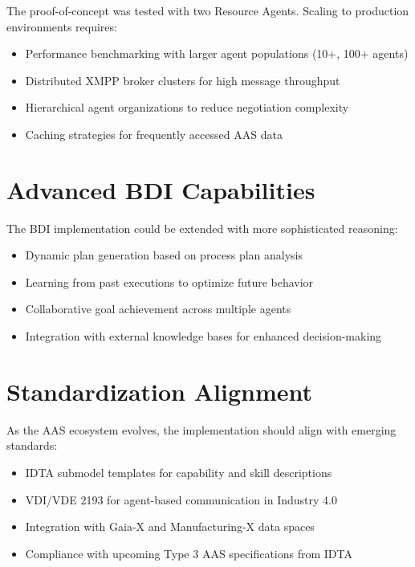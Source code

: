 The proof-of-concept was tested with two Resource Agents. Scaling to production environments requires:

\begin{itemize}
    \item Performance benchmarking with larger agent populations (10+, 100+ agents)
    \item Distributed \ac{XMPP} broker clusters for high message throughput
    \item Hierarchical agent organizations to reduce negotiation complexity
    \item Caching strategies for frequently accessed \ac{AAS} data
\end{itemize}

\section{Advanced BDI Capabilities}

The BDI implementation could be extended with more sophisticated reasoning:

\begin{itemize}
    \item Dynamic plan generation based on process plan analysis
    \item Learning from past executions to optimize future behavior
    \item Collaborative goal achievement across multiple agents
    \item Integration with external knowledge bases for enhanced decision-making
\end{itemize}

\section{Standardization Alignment}

As the \ac{AAS} ecosystem evolves, the implementation should align with emerging standards:

\begin{itemize}
    \item IDTA submodel templates for capability and skill descriptions
    \item VDI/VDE 2193 for agent-based communication in Industry 4.0
    \item Integration with Gaia-X and Manufacturing-X data spaces
    \item Compliance with upcoming Type 3 \ac{AAS} specifications from IDTA
\end{itemize}

